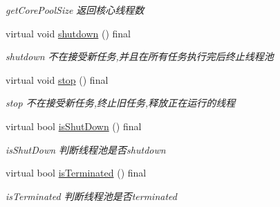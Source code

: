 \begin{DoxyCompactItemize}
\begin{DoxyCompactList}\small\item\em get\+Core\+Pool\+Size 返回核心线程数 \end{DoxyCompactList}\item 
\mbox{\label{classThreadPoolExecutor_aaa834c4350d6b12826803bb13dd467ea}} 
virtual void \hyperlink{classThreadPoolExecutor_aaa834c4350d6b12826803bb13dd467ea}{shutdown} () final
\begin{DoxyCompactList}\small\item\em shutdown 不在接受新任务,并且在所有任务执行完后终止线程池 \end{DoxyCompactList}\item 
\mbox{\label{classThreadPoolExecutor_a588ec33baf402afd0e1c52b11d9234da}} 
virtual void \hyperlink{classThreadPoolExecutor_a588ec33baf402afd0e1c52b11d9234da}{stop} () final
\begin{DoxyCompactList}\small\item\em stop 不在接受新任务,终止旧任务,释放正在运行的线程 \end{DoxyCompactList}\item 
virtual bool \hyperlink{classThreadPoolExecutor_ac33c356670eabe5345992331e615348c}{is\+Shut\+Down} () final
\begin{DoxyCompactList}\small\item\em is\+Shut\+Down 判断线程池是否shutdown \end{DoxyCompactList}\item 
virtual bool \hyperlink{classThreadPoolExecutor_a89ed68d6c67ad6fbde73b7883c8107a7}{is\+Terminated} () final
\begin{DoxyCompactList}\small\item\em is\+Terminated 判断线程池是否terminated \end{DoxyCompactList}\end{DoxyCompactItemize}

